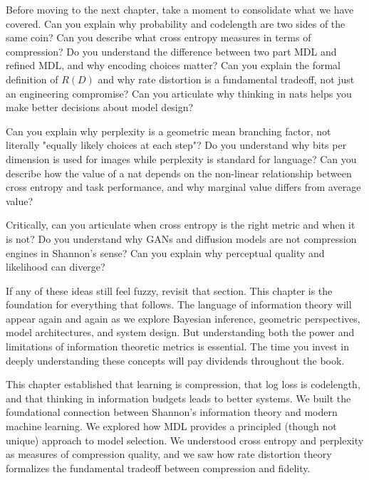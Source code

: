 \begin{pausebox}
Before moving to the next chapter, take a moment to consolidate what we have covered. Can you explain why probability and codelength are two sides of the same coin? Can you describe what cross entropy measures in terms of compression? Do you understand the difference between two part MDL and refined MDL, and why encoding choices matter? Can you explain the formal definition of $R(D)$ and why rate distortion is a fundamental tradeoff, not just an engineering compromise? Can you articulate why thinking in nats helps you make better decisions about model design?

\vspace{0.5em}

Can you explain why perplexity is a geometric mean branching factor, not literally "equally likely choices at each step"? Do you understand why bits per dimension is used for images while perplexity is standard for language? Can you describe how the value of a nat depends on the non-linear relationship between cross entropy and task performance, and why marginal value differs from average value?

\vspace{0.5em}

Critically, can you articulate when cross entropy is the right metric and when it is not? Do you understand why GANs and diffusion models are not compression engines in Shannon's sense? Can you explain why perceptual quality and likelihood can diverge?

\vspace{0.5em}

If any of these ideas still feel fuzzy, revisit that section. This chapter is the foundation for everything that follows. The language of information theory will appear again and again as we explore Bayesian inference, geometric perspectives, model architectures, and system design. But understanding both the power and limitations of information theoretic metrics is essential. The time you invest in deeply understanding these concepts will pay dividends throughout the book.
\end{pausebox}

\vspace{1em}

This chapter established that learning is compression, that log loss is codelength, and that thinking in information budgets leads to better systems. We built the foundational connection between Shannon's information theory and modern machine learning. We explored how MDL provides a principled (though not unique) approach to model selection. We understood cross entropy and perplexity as measures of compression quality, and we saw how rate distortion theory formalizes the fundamental tradeoff between compression and fidelity.

